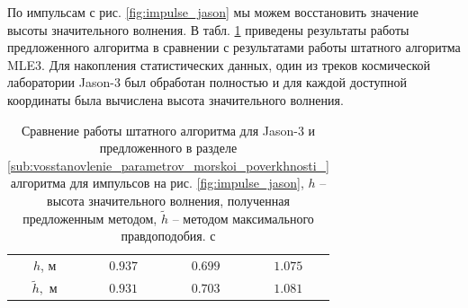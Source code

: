 По импульсам с рис. \ref{fig:impulse_jason} мы можем восстановить значение
высоты значительного волнения. В табл. \ref{tab:real} приведены результаты
работы предложенного алгоритма в сравнении с результатами работы штатного
алгоритма MLE3. Для накопления
статистических данных, один из треков космической лаборатории Jason-3 был
обработан полностью и для каждой доступной координаты была вычислена
высота значительного волнения. 
\begin{table}[h]
    \centering
    \caption{Сравнение работы штатного алгоритма для Jason-3 и предложенного в
    разделе \ref{sub:vosstanovlenie_parametrov_morskoi_poverkhnosti_} алгоритма
для импульсов на рис. \ref{fig:impulse_jason}, $h$ --
высота значительного волнения, полученная предложенным методом,  $\tilde h$ --
методом максимального правдоподобия.
с}
    \label{tab:real} 
    \begin{tabular}{|c|c|c|c|}
        \hline
        $h$, м      & $0.937 $ & $0.699$ & $1.075$ \\
        $\tilde h,$ м & $0.931$ & $0.703$ & $1.081$ \\
        \hline
    \end{tabular}
\end{table}

